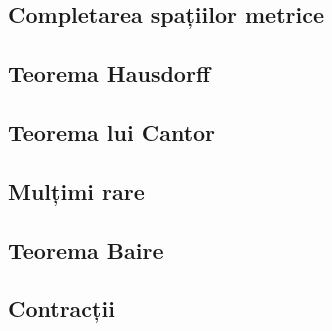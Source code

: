 \documentclass[a4paper,12pt]{article}
\theoremstyle{change}
\begin{document}

\subsection{Completarea spațiilor metrice}

\subsection{Teorema Hausdorff}


\subsection{Teorema lui Cantor}

\subsection{Mulțimi rare}

\subsection{Teorema Baire}


\subsection{Contracții}
\end{document}
